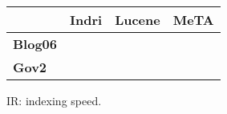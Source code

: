 \begin{figure}[t]
\centering
{\small
\begin{tabular}{|l|r|r|r|}
        \hline & \textbf{Indri} & \textbf{Lucene} & \textbf{MeTA} \\
        \hline
        \textbf{Blog06} & & & \\
        \textbf{Gov2}    & & & \\
        \hline
\end{tabular}
}
\caption{IR: indexing speed.}
\label{fig:ir-indexing}
\end{figure}
